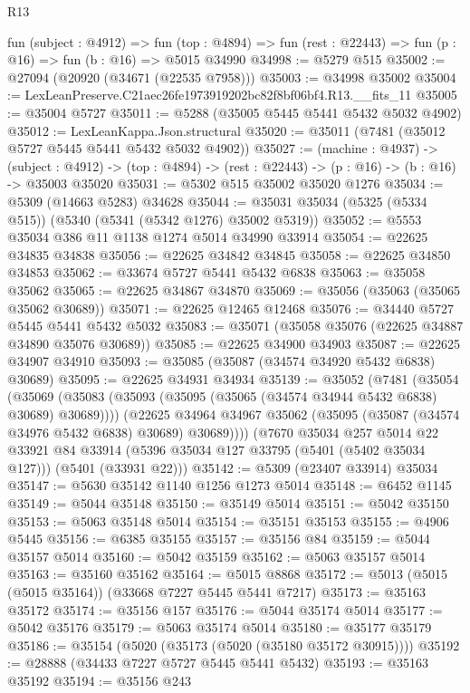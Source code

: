 \begin{lexlean}{R13}
\begin{coremodule}
  fun (subject : @4912) =>
  fun (top : @4894) => fun (rest : @22443) => fun (p : @16) => fun (b : @16) => @5015 @34990
@34998 := @5279 @515
@35002 := @27094 (@20920 (@34671 (@22535 @7958)))
@35003 := @34998 @35002
@35004 := LexLeanPreserve.C21aec26fe1973919202bc82f8bf06bf4.R13.__fits_11
@35005 := @35004 @5727
@35011 := @5288 (@35005 @5445 @5441 @5432 @5032 @4902)
@35012 := LexLeanKappa.Json.structural
@35020 := @35011 (@7481 (@35012 @5727 @5445 @5441 @5432 @5032 @4902))
@35027 := (machine : @4937) ->
  (subject : @4912) -> (top : @4894) -> (rest : @22443) -> (p : @16) -> (b : @16) -> @35003 @35020
@35031 := @5302 @515 @35002 @35020 @1276
@35034 := @5309 (@14663 @5283) @34628
@35044 := @35031 @35034 (@5325 (@5334 @515)) (@5340 (@5341 (@5342 @1276) @35002 @5319))
@35052 := @5553 @35034 @386 @11 @1138 @1274 @5014 @34990 @33914
@35054 := @22625 @34835 @34838
@35056 := @22625 @34842 @34845
@35058 := @22625 @34850 @34853
@35062 := @33674 @5727 @5441 @5432 @6838
@35063 := @35058 @35062
@35065 := @22625 @34867 @34870
@35069 := @35056 (@35063 (@35065 @35062 @30689))
@35071 := @22625 @12465 @12468
@35076 := @34440 @5727 @5445 @5441 @5432 @5032
@35083 := @35071 (@35058 @35076 (@22625 @34887 @34890 @35076 @30689))
@35085 := @22625 @34900 @34903
@35087 := @22625 @34907 @34910
@35093 := @35085 (@35087 (@34574 @34920 @5432 @6838) @30689)
@35095 := @22625 @34931 @34934
@35139 := @35052
    (@7481
      (@35054
        (@35069 (@35083 (@35093 (@35095 (@35065 (@34574 @34944 @5432 @6838) @30689) @30689))))
        (@22625 @34964 @34967 @35062 (@35095 (@35087 (@34574 @34976 @5432 @6838) @30689) @30689))))
    (@7670
      @35034
      @257
      @5014
      @22
      @33921
      @84
      @33914
      (@5396 @35034 @127 @33795 (@5401 (@5402 @35034 @127)))
      (@5401 (@33931 @22)))
@35142 := @5309 (@23407 @33914) @35034
@35147 := @5630 @35142 @1140 @1256 @1273 @5014
@35148 := @6452 @1145
@35149 := @5044 @35148
@35150 := @35149 @5014
@35151 := @5042 @35150
@35153 := @5063 @35148 @5014
@35154 := @35151 @35153
@35155 := @4906 @5445
@35156 := @6385 @35155
@35157 := @35156 @84
@35159 := @5044 @35157 @5014
@35160 := @5042 @35159
@35162 := @5063 @35157 @5014
@35163 := @35160 @35162
@35164 := @5015 @8868
@35172 := @5013 (@5015 (@5015 @35164)) (@33668 @7227 @5445 @5441 @7217)
@35173 := @35163 @35172
@35174 := @35156 @157
@35176 := @5044 @35174 @5014
@35177 := @5042 @35176
@35179 := @5063 @35174 @5014
@35180 := @35177 @35179
@35186 := @35154 (@5020 (@35173 (@5020 (@35180 @35172 @30915))))
@35192 := @28888 (@34433 @7227 @5727 @5445 @5441 @5432)
@35193 := @35163 @35192
@35194 := @35156 @243

\end{coremodule}
\end{lexlean}
